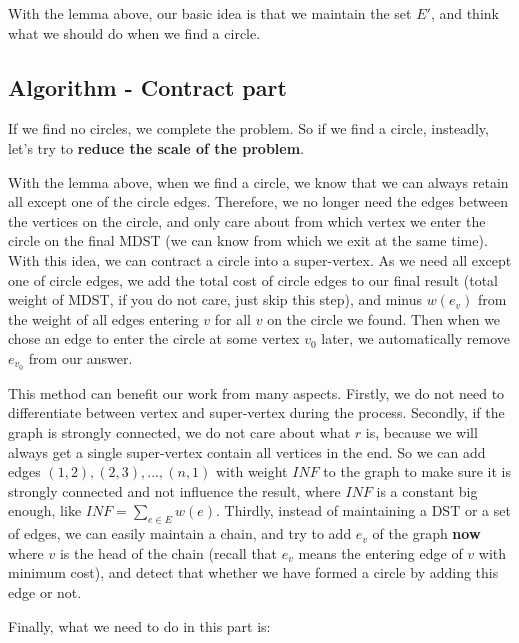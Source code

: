 \documentclass{article}
\begin{document}
With the lemma above, our basic idea is that we maintain the set $E'$, and think what we should do when we find a circle.

\subsection{Algorithm - Contract part}

If we find no circles, we complete the problem. So if we find a circle, insteadly, let's try to \textbf{reduce the scale of the problem}.

With the lemma above, when we find a circle, we know that we can always retain all except one of the circle edges. Therefore, we no longer need the edges between the vertices on the circle, and only care about from which vertex we enter the circle on the final MDST (we can know from which we exit at the same time). With this idea, we can contract a circle into a super-vertex. As we need all except one of circle edges, we add the total cost of circle edges to our final result (total weight of MDST, if you do not care, just skip this step), and minus $w(e_v)$ from the weight of all edges entering $v$ for all $v$ on the circle we found. Then when we chose an edge to enter the circle at some vertex $v_0$ later, we automatically remove $e_{v_0}$ from our answer.

This method can benefit our work from many aspects. Firstly, we do not need to differentiate between vertex and super-vertex during the process. Secondly, if the graph is strongly connected, we do not care about what $r$ is, because we will always get a single super-vertex contain all vertices in the end. So we can add edges $(1,2),(2,3),...,(n,1)$ with weight $INF$ to the graph to make sure it is strongly connected and not influence the result, where $INF$ is a constant big enough, like $INF=\sum_{e\in E}w(e)$. Thirdly, instead of maintaining a DST or a set of edges, we can easily maintain a chain, and try to add $e_v$ of the graph \textbf{now} where $v$ is the head of the chain (recall that $e_v$ means the entering edge of $v$ with minimum cost), and detect that whether we have formed a circle by adding this edge or not.

Finally, what we need to do in this part is:
\end{document}
